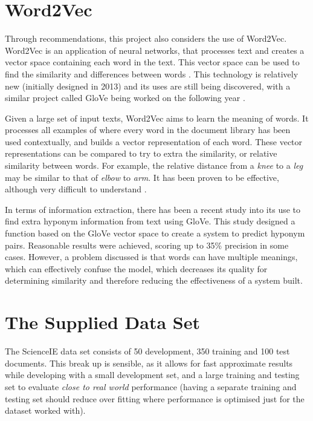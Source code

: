 \section{Word2Vec}
Through recommendations, this project also considers the use of Word2Vec. Word2Vec is an application of neural networks, that processes text and creates a vector space containing each word in the text. This vector space can be used to find the similarity and differences between words \cite{Mikolov2013}. This technology is relatively new (initially designed in 2013) and its uses are still being discovered, with a similar project called GloVe being worked on the following year \cite{Pennington2014}.

Given a large set of input texts, Word2Vec aims to learn the meaning of words. It processes all examples of where every word in the document library has been used contextually, and builds a vector representation of each word. These vector representations can be compared to try to extra the similarity, or relative similarity between words. For example, the relative distance from a \textit{knee} to a \textit{leg} may be similar to that of \textit{elbow} to \textit{arm}. It has been proven to be effective, although very difficult to understand \cite{Goldberg2014}. 

In terms of information extraction, there has been a recent study into its use to find extra hyponym information from text \cite{Nayak2015} using GloVe. This study designed a function based on the GloVe vector space to create a system to predict hyponym pairs. Reasonable results were achieved, scoring up to 35\% precision in some cases. However, a problem discussed is that words can have multiple meanings, which can effectively confuse the model, which decreases its quality for determining similarity and therefore reducing the effectiveness of a system built. 

\section{The Supplied Data Set}
The ScienceIE data set consists of 50 development, 350 training and 100 test documents. This break up is sensible, as it allows for fast approximate results while developing with a small development set, and a large training and testing set to evaluate \textit{close to real world} performance (having a separate training and testing set should reduce over fitting where performance is optimised just for the dataset worked with).

